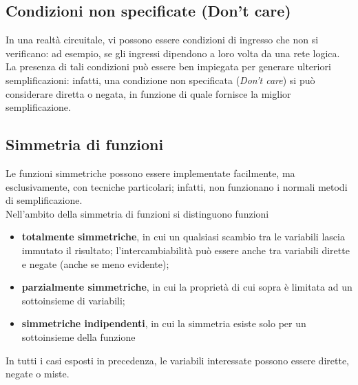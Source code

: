 \documentclass[a4paper]{extarticle}
\begin{document}
\vspace{1em}
\noindent
\subsection{Condizioni non specificate (Don't care)}
In una realtà circuitale, vi possono essere condizioni di ingresso che non si verificano: ad esempio, se gli ingressi dipendono a loro volta da una rete logica.\\
La presenza di tali condizioni può essere ben impiegata per generare ulteriori semplificazioni: infatti, una condizione non specificata (\textit{Don't care}) si può considerare diretta o negata, in funzione di quale fornisce la miglior semplificazione.

\vspace{1em}
\noindent
\subsection{Simmetria di funzioni}
Le funzioni simmetriche possono essere implementate facilmente, ma esclusivamente, con tecniche particolari; infatti, non funzionano i normali metodi di semplificazione.\\
Nell'ambito della simmetria di funzioni si distinguono funzioni
\begin{itemize}
    \item \textbf{totalmente simmetriche}, in cui un qualsiasi scambio tra le variabili lascia immutato il risultato; l'intercambiabilità può essere anche tra variabili dirette e negate (anche se meno evidente);
    \item \textbf{parzialmente simmetriche}, in cui la proprietà di cui sopra è limitata ad un sottoinsieme di variabili;
    \item \textbf{simmetriche indipendenti}, in cui la simmetria esiste solo per un sottoinsieme della funzione
\end{itemize}
In tutti i casi esposti in precedenza, le variabili interessate possono essere dirette, negate o miste.
\end{document}
